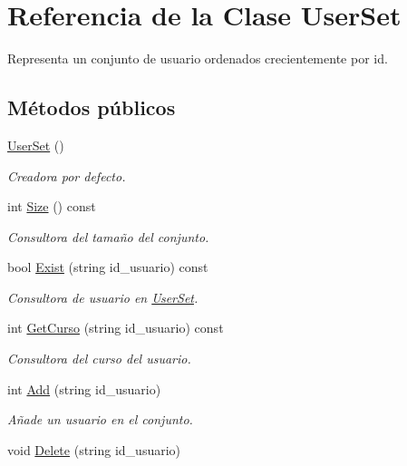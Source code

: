 \hypertarget{class_user_set}{}\section{Referencia de la Clase User\+Set}
\label{class_user_set}


Representa un conjunto de usuario ordenados crecientemente por id.  


\subsection*{Métodos públicos}
\begin{DoxyCompactItemize}
\item 
\mbox{\hyperlink{class_user_set_a1fcb7215d45571e0f9c4cf4f20b05c80}{User\+Set}} ()
\begin{DoxyCompactList}\small\item\em Creadora por defecto. \end{DoxyCompactList}\item 
int \mbox{\hyperlink{class_user_set_a2474615357041661d6c00ce66209e747}{Size}} () const
\begin{DoxyCompactList}\small\item\em Consultora del tamaño del conjunto. \end{DoxyCompactList}\item 
bool \mbox{\hyperlink{class_user_set_a71ead20f591befdba9f6a1e524fa3271}{Exist}} (string id\+\_\+usuario) const
\begin{DoxyCompactList}\small\item\em Consultora de usuario en \mbox{\hyperlink{class_user_set}{User\+Set}}. \end{DoxyCompactList}\item 
int \mbox{\hyperlink{class_user_set_a20c73031d173fac4db788598ea20ce79}{Get\+Curso}} (string id\+\_\+usuario) const
\begin{DoxyCompactList}\small\item\em Consultora del curso del usuario. \end{DoxyCompactList}\item 
int \mbox{\hyperlink{class_user_set_af0b143d52582d95f08ad92c9eee64394}{Add}} (string id\+\_\+usuario)
\begin{DoxyCompactList}\small\item\em Añade un usuario en el conjunto. \end{DoxyCompactList}\item 
void \mbox{\hyperlink{class_user_set_a9a548c48abafd33e8460d9e8a9e40170}{Delete}} (string id\+\_\+usuario)

\end{DoxyCompactItemize}

